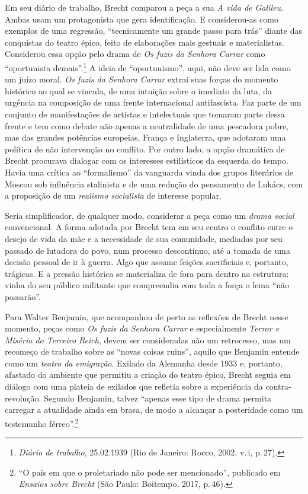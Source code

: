 Em seu diário de trabalho, Brecht comparou a peça a sua {\it A vida de
Galileu}. Ambas usam um protagonista que gera identificação. E
considerou-as como exemplos de uma regressão, “tecnicamente um grande
passo para trás” diante das conquistas do teatro épico, feito de
elaborações mais gestuais e materialistas. Considerou essa opção pelo
drama de {\it Os fuzis da Senhora Carrar} como “oportunista
demais”.\footnote{{\it Diário de trabalho}, 25.02.1939 (Rio de Janeiro:
  Rocco, 2002, v.\,{\sc i}, p.\,27).} A ideia de “oportunismo”, aqui, não deve
ser lida como um juízo moral. {\it Os fuzis da Senhora Carrar} extrai
suas forças do momento histórico ao qual se vincula, de uma intuição
sobre o imediato da luta, da urgência na composição de uma frente
internacional antifascista. Faz parte de um conjunto de manifestações de
artistas e intelectuais que tomaram parte dessa frente e tem como debate
não apenas a neutralidade de uma pescadora pobre, mas das grandes
potências europeias, França e Inglaterra, que adotaram uma política de
não intervenção no conflito. Por outro lado, a opção dramática de Brecht
procurava dialogar com os interesses estilísticos da esquerda do tempo.
Havia uma crítica ao “formalismo” da vanguarda vinda dos grupos
literários de Moscou sob influência stalinista e de uma redução do
pensamento de Lukács, com a proposição de um {\it realismo socialista}
de interesse popular.

Seria simplificador, de qualquer modo, considerar a peça como um
{\it drama social} convencional. A forma adotada por Brecht tem em seu
centro o conflito entre o desejo de vida da mãe e a necessidade de sua
comunidade, mediadas por seu passado de lutadora do povo, num processo
descontínuo, até a tomada de uma decisão pessoal de ir à guerra. Algo
que assume feições sacrificiais e, portanto, trágicas. E a pressão
histórica se materializa de fora para dentro na estrutura: vinha do seu
público militante que compreendia com toda a força o lema “não
passarão”.

Para Walter Benjamin, que acompanhou de perto as reflexões de Brecht
nesse momento, peças como {\it Os fuzis da Senhora Carrar} e
especialmente {\it Terror e Miséria do Terceiro Reich}, devem ser
consideradas não um retrocesso, mas um recomeço de trabalho sobre as
“novas coisas ruins”, aquilo que Benjamin entende como um {\it teatro da
emigração}. Exilado da Alemanha desde 1933 e, portanto, afastado do
ambiente que permitiu a criação do teatro épico, Brecht seguia em
diálogo com uma plateia de exilados que refletia sobre a experiência da
contra-revolução. Segundo Benjamin, talvez “apenas esse tipo de drama
permita carregar a atualidade ainda em brasa, de modo a alcançar a
posteridade como um testemunho férreo”.\footnote{“O país em que o
  proletariado não pode ser mencionado”, publicado em {\it Ensaios sobre
  Brecht} (São Paulo: Boitempo, 2017, p.\,46).}

